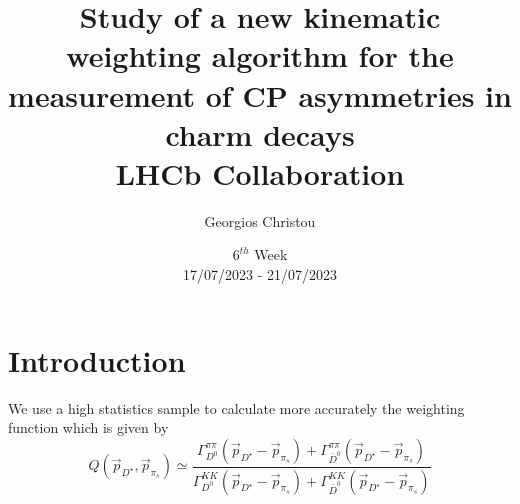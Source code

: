 \documentclass{article}
\title{
        \textbf{Study of a new kinematic weighting algorithm for the measurement of CP asymmetries in charm decays}
        \\
        LHCb Collaboration
}
\author{Georgios Christou}
\date{
        $6^{th}$ Week
        \\
        17/07/2023 - 21/07/2023
}
\begin{document}
    \begin{figure}[t]
        \centering
        \hspace{1cm}
    \end{figure}
    \maketitle

    \pagebreak
    
    \section{Introduction}

    We use a high statistics sample to calculate more accurately the weighting function which is given by
    \begin{equation}
        \label{eq:weighting}
        Q(\vec{p}_{D^\star}, \vec{p}_{\pi_s}) \simeq \frac{\Gamma_{D^0}^{\pi\pi}(\vec{p}_{D^\star} - \vec{p}_{\pi_s}) + \Gamma_{\bar{D}^0}^{\pi\pi}(\vec{p}_{D^\star} - \vec{p}_{\pi_s})}{\Gamma_{D^0}^{KK}(\vec{p}_{D^\star} - \vec{p}_{\pi_s}) + \Gamma_{\bar{D}^0}^{KK}(\vec{p}_{D^\star} - \vec{p}_{\pi_s})}
    \end{equation}
\end{document}

